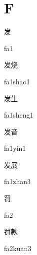 ﻿%
\section*{F}

\begin{verbete}[fa1]{发}
\begin{pronuncia}{fa1}
\end{pronuncia}
\end{verbete}

\begin{verbete}[fa1shao1]{发烧}
\begin{pronuncia}{fa1shao1}
\end{pronuncia}
\end{verbete}

\begin{verbete}[fa1sheng1]{发生}
\begin{pronuncia}{fa1sheng1}
\end{pronuncia}
\end{verbete}

\begin{verbete}[fa1yin1]{发音}
\begin{pronuncia}{fa1yin1}
\end{pronuncia}
\end{verbete}

\begin{verbete}[fa1zhan3]{发展}
\begin{pronuncia}{fa1zhan3}
\end{pronuncia}
\end{verbete}

\begin{verbete}[fa2]{罚}
\begin{pronuncia}{fa2}
\end{pronuncia}
\end{verbete}

\begin{verbete}[fa2kuan3]{罚款}
\begin{pronuncia}{fa2kuan3}
\end{pronuncia}
\end{verbete}

